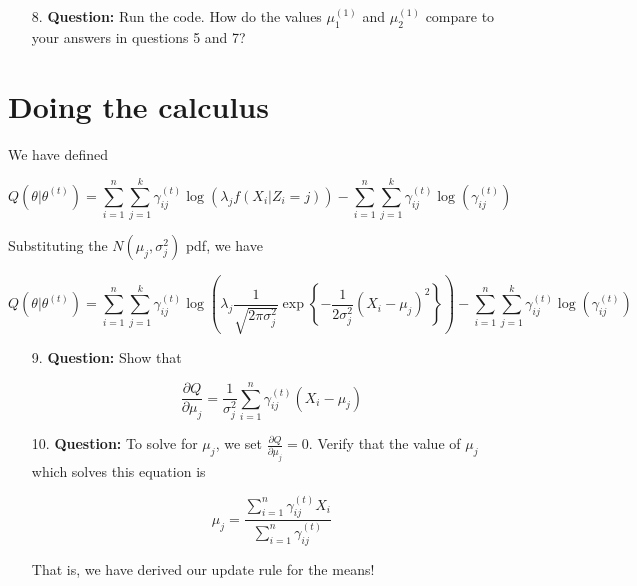 \documentclass[12pt]{article}
\begin{document}
\begin{enumerate}
\item[8.] \textbf{Question:} Run the code. How do the values $\mu_1^{(1)}$ and $\mu_2^{(1)}$ compare to your answers in questions 5 and 7?

\vspace{4cm}
\end{enumerate}

\section*{Doing the calculus}

We have defined

$$Q(\theta | \theta^{(t)}) = \sum \limits_{i=1}^n \sum \limits_{j=1}^k \gamma_{ij}^{(t)} \log (\lambda_j f(X_i | Z_i = j)) - \sum \limits_{i=1}^n \sum \limits_{j=1}^k \gamma_{ij}^{(t)} \log(\gamma_{ij}^{(t)})$$

Substituting the $N(\mu_j, \sigma_j^2)$ pdf, we have

$$Q(\theta | \theta^{(t)}) = \sum \limits_{i=1}^n \sum \limits_{j=1}^k \gamma_{ij}^{(t)} \log \left(\lambda_j \frac{1}{\sqrt{2 \pi \sigma_j^2}} \exp \left\lbrace -\frac{1}{2 \sigma_j^2} (X_i - \mu_j)^2 \right\rbrace \right) - \sum \limits_{i=1}^n \sum \limits_{j=1}^k \gamma_{ij}^{(t)} \log(\gamma_{ij}^{(t)})$$

\begin{enumerate}
\item[9.] \textbf{Question:} Show that

$$\frac{\partial Q}{\partial \mu_j} = \frac{1}{\sigma_j^2} \sum \limits_{i=1}^n \gamma_{ij}^{(t)} (X_i - \mu_j)$$

\newpage

\item[10.] \textbf{Question:} To solve for $\mu_j$, we set $\frac{\partial Q}{\partial \mu_j} = 0$. Verify that the value of $\mu_j$ which solves this equation is

$$\mu_j = \frac{\sum \limits_{i=1}^n \gamma_{ij}^{(t)} X_i}{\sum \limits_{i=1}^n \gamma_{ij}^{(t)}}$$

That is, we have derived our update rule for the means!
\end{enumerate}
\end{document}

